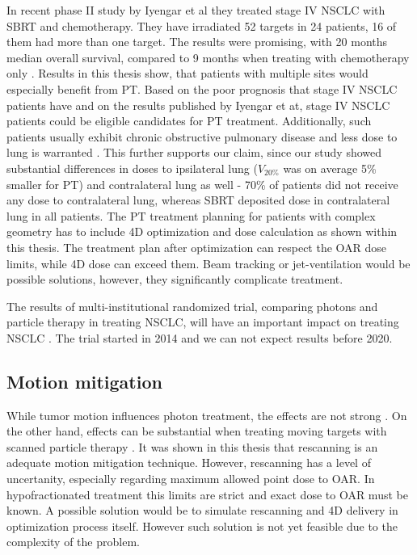 \documentclass[type=dr, dr=rernat, accentcolor=tud7b,colorbacktitle, bigchapter, openright, twoside, 12pt ]{tudthesis}
\begin{document}
In recent phase II study by Iyengar et al \cite{Iyengar2014} they treated stage IV NSCLC with SBRT and chemotherapy. They have irradiated 52 targets in 24 patients, 16 of them had more than one target. The results were promising, with 20 months median overall survival, 
compared to 9 months when treating with chemotherapy only \cite{Tsao2008}. Results in this thesis show, that patients with multiple sites would especially benefit from PT. Based on the poor prognosis that stage IV NSCLC patients have and on the results published by Iyengar et at,
stage IV NSCLC patients could be eligible candidates for PT treatment. Additionally, such patients usually exhibit chronic obstructive pulmonary disease and less dose to lung is warranted \cite{Westover2012}. This further supports our claim, since our study showed substantial differences in 
doses to ipsilateral lung ($V_{20\%}$ was on average 5\% smaller for PT) and contralateral lung as well - 70\% of patients did not receive any dose to contralateral lung, whereas SBRT deposited dose in contralateral lung in all patients.
The PT treatment planning for patients with complex geometry has to include 4D optimization and dose calculation as shown within this thesis. The treatment plan after optimization can respect the
OAR dose limits, while 4D dose can exceed them. Beam tracking \cite{Bert2007} or jet-ventilation \cite{Santiago2013} would be possible solutions, however, they significantly complicate treatment.

The results of multi-institutional randomized trial, comparing photons and particle therapy in treating NSCLC, will have an important impact on treating NSCLC \cite{RTOG1308}. 
The trial started in 2014 and we can not expect results before 2020.

\subsection{Motion mitigation}

While tumor motion influences photon treatment, the effects are not strong \cite{Zou2014}. On the other hand, effects can be substantial when treating moving targets with scanned particle therapy \cite{Bert2008}.
It was shown in this thesis that rescanning is an adequate motion mitigation technique. However, rescanning has a level of uncertanity, especially regarding maximum allowed point dose to OAR.
In hypofractionated treatment this limits are strict and exact dose to OAR must be known. A possible solution would be to simulate rescanning and 4D delivery in optimization process itself. 
However such solution is not yet feasible due to the complexity of the problem.
\end{document}
